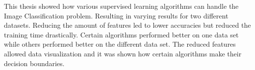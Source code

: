 This thesis showed how various supervised learning algorithms can handle the Image Classification problem. Resulting in varying results for two different datasets. Reducing the amount of features led to lower accuracies but reduced the training time drastically. Certain algorithms performed better on one data set while others performed better on the different data set. The reduced features allowed data visualization and it was shown how certain algorithms make their decision boundaries.    